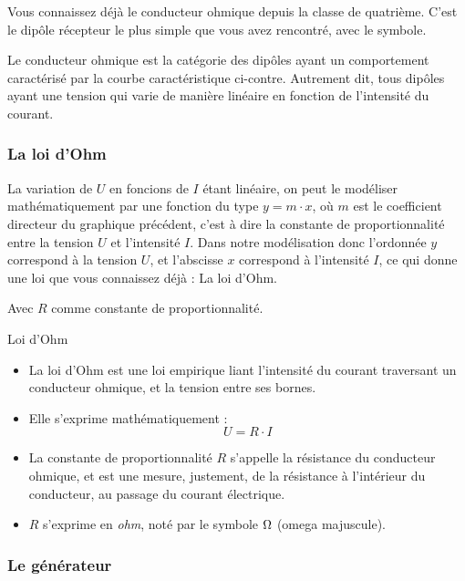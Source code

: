 \documentclass[11pt,a4paper]{article}
\begin{document}
Vous connaissez déjà le conducteur ohmique depuis la classe de quatrième. C'est le dipôle récepteur le plus simple que vous avez rencontré, avec le symbole. 

Le conducteur ohmique est la catégorie des dipôles ayant un comportement caractérisé par la courbe caractéristique ci-contre. Autrement dit, tous dipôles ayant une tension qui varie de manière linéaire en fonction de l'intensité du courant. 

\endgroup

\subsubsection*{La loi d'Ohm}
La variation de $U$ en foncions de $I$ étant linéaire, on peut le modéliser mathématiquement par une fonction du type $y = m\cdot x$, où $m$ est le coefficient directeur du graphique précédent, c'est à dire la constante de proportionnalité entre la tension $U$ et l'intensité $I$. Dans notre modélisation donc l'ordonnée $y$ correspond à la tension $U$, et l'abscisse $x$ correspond à l'intensité $I$, ce qui donne une loi que vous connaissez déjà : La loi d'Ohm.

Avec $R$ comme constante de proportionnalité. 

\begin{defn}{Loi d'Ohm}
\begin{itemize}
    \item La loi d'Ohm est une loi empirique liant l'intensité du courant traversant un conducteur ohmique, et la tension entre ses bornes. 
    \item Elle s'exprime mathématiquement : 
    \[ U = R\cdot I \]
    \item La constante de proportionnalité $R$ s'appelle la résistance du conducteur ohmique, et est une mesure, justement, de la résistance à l'intérieur du conducteur, au passage du courant électrique. 
    \item $R$ s'exprime en \emph{ohm}, noté par le symbole $\ohm$ (omega majuscule). 
\end{itemize}
\end{defn}



\subsubsection*{Le générateur}
\begingroup
\end{document}
